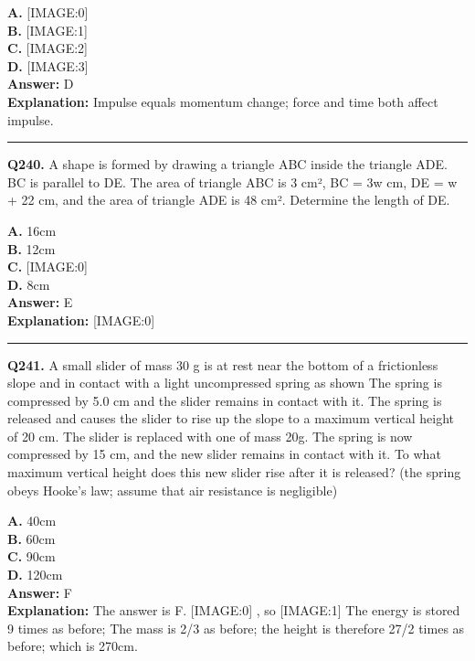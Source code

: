 \documentclass[12pt]{article}
\begin{document}
\textbf{A.} [IMAGE:0] \\
\textbf{B.} [IMAGE:1] \\
\textbf{C.} [IMAGE:2] \\
\textbf{D.} [IMAGE:3] \\

\textbf{Answer:} D \\
\textbf{Explanation:} Impulse equals momentum change; force and time both affect impulse.

\hrule
\vspace{1em}


\noindent
\textbf{Q240.} A shape is formed by drawing a triangle ABC inside the triangle ADE. BC is parallel to DE. The area of triangle ABC is 3 cm², BC = 3w cm, DE = w + 22 cm, and the area of triangle ADE is 48 cm².
Determine the length of DE.



\textbf{A.} 16cm \\
\textbf{B.} 12cm \\
\textbf{C.} [IMAGE:0] \\
\textbf{D.} 8cm \\

\textbf{Answer:} E \\
\textbf{Explanation:} [IMAGE:0]

\hrule
\vspace{1em}


\noindent
\textbf{Q241.} A small slider of mass 30 g is at rest near the bottom of a frictionless slope and in contact with a light uncompressed spring as shown
The spring is compressed by 5.0 cm and the slider remains in contact with it.
The spring is released and causes the slider to rise up the slope to a maximum vertical height of 20 cm.
The slider is replaced with one of mass 20g.
The spring is now compressed by 15 cm, and the new slider remains in contact with it. To what maximum vertical height does this new slider rise after it is released?
(the spring obeys Hooke’s law; assume that air resistance is negligible)



\textbf{A.} 40cm \\
\textbf{B.} 60cm \\
\textbf{C.} 90cm \\
\textbf{D.} 120cm \\

\textbf{Answer:} F \\
\textbf{Explanation:} The answer is F.
[IMAGE:0]
, so
[IMAGE:1]
The energy is stored 9 times as before; The mass is 2/3 as before; the height is therefore 27/2 times as before; which is 270cm.
\end{document}
